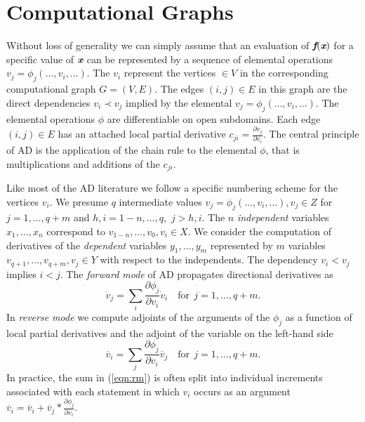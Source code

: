 \documentclass{book}
\newcommand{\bmf}{\mbox{\bf\em f}}
\newcommand{\bmx}{\mbox{\bf\em x}}
\newcommand{\refeqn}[1]{{(\ref{#1})}}
\begin{document}
\section{Computational Graphs} \label{sec:computationalGraphs}

Without loss of generality we can simply assume that an evaluation of $\bmf(\bmx)$ for  
a specific value of $\bmx$ can be represented by a sequence of 
elemental operations $v_j=\phi_j(\ldots,v_i,\ldots)$. 
The $v_i$ represent the vertices $\in V$ in the corresponding computational 
graph $G=(V,E)$. The edges $(i,j)\in E$ in this graph are the direct dependencies 
$v_i\prec v_j$ implied by the elemental $v_j=\phi_j(\ldots,v_i,\ldots)$.
The elemental operations $\phi$ are differentiable on open subdomains. 
Each edge $(i,j)\in E$ has an attached local partial derivative 
$c_{ji}=\frac{\partial v_j}{\partial v_i}$. 
The central principle of AD is 
the application of the chain rule to the elemental $\phi$, that is 
multiplications and additions of the  $c_{ji}$.  

Like most of the AD literature we follow a specific numbering scheme for the vertices $v_i$.
We presume $q$ intermediate values
$v_j = \phi_j(\ldots,v_i,\ldots), v_j\in Z$
for $j=1,\ldots,q+m$ and $h,i=1-n,\ldots,q,$ $j>h,i$. 
The $n$ {\em independent}
variables $x_1,\ldots,x_n$ correspond to 
$v_{1-n},\ldots,v_0, v_i\in X$. 
We consider the 
computation of derivatives of the {\em dependent} variables 
$y_1,\ldots,y_m$ represented by $m$ variables $v_{q+1},\ldots,v_{q+m}, v_j\in Y$
with respect to the independents. 
The dependency $v_i<v_j$ implies $i<j$. 
The {\em forward mode} of AD propagates directional derivatives
as 
\begin{equation} \label{eqn:fm}
  \dot{v}_j= \sum\limits_i\frac{\partial \phi_j}{\partial v_i}\dot{v}_i 
  \quad \text{for}~~j=1,\ldots,q+m.
\end{equation} 
In {\em reverse mode} we compute adjoints of the arguments of the $\phi_j$
as a function of local partial derivatives and the 
adjoint of the variable on the left-hand side
\begin{equation} \label{eqn:rm}
  \overline{v}_i= \sum\limits_j\frac{\partial \phi_j}{\partial v_i}\overline{v}_j 
  \quad \text{for}~~j=1,\ldots,q+m.
\end{equation} 
In practice, the sum in \refeqn{eqn:rm} is often split into individual increments 
associated with each statement in which $v_i$ occurs as an argument 
$\overline{v}_i=\overline{v}_i+\overline{v}_j * \frac{\partial \phi_j}{\partial v_i}$.
\end{document}
